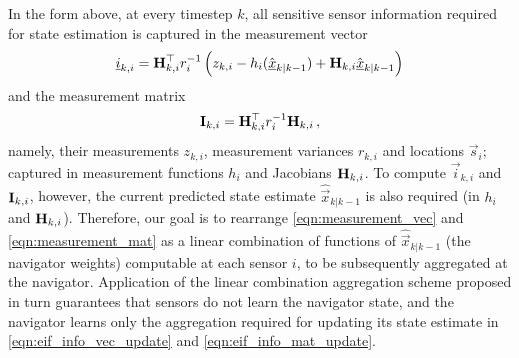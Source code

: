 In the form above, at every timestep $k$, all sensitive sensor information required for state estimation is captured in the measurement vector
\begin{equation}
    {\underline{i}}_{k,i} = {{\mathbf{H}}}^\top_{k,i} r^{-1}_i \left(z_{k,i} - h_i(\hat{{\underline{x}}}_{k|k-1}) + {{\mathbf{H}}}_{k,i}\hat{{\underline{x}}}_{k|k-1}\right) \label{eqn:measurement_vec}
\end{equation}
and the measurement matrix
\begin{equation}
    {\ensuremath{{\mathbf{I}}}}_{k,i} = {{\mathbf{H}}}^\top_{k,i} r^{-1}_i {{\mathbf{H}}}_{k,i}\,, \label{eqn:measurement_mat}
\end{equation}
namely, their measurements $z_{k,i}$, measurement variances $r_{k,i}$ and locations $\vec{s}_i$; captured in measurement functions $h_i$ and Jacobians ${{\mathbf{H}}}_{k,i}$. To compute $\vec{i}_{k,i}$ and ${{\mathbf{I}}}_{k,i}$, however, the current predicted state estimate $\hat{\vec{x}}_{k|k-1}$ is also required (in $h_i$ and ${{\mathbf{H}}}_{k,i}$). Therefore, our goal is to rearrange \eqref{eqn:measurement_vec} and \eqref{eqn:measurement_mat} as a linear combination of functions of $\hat{\vec{x}}_{k|k-1}$ (the navigator weights) computable at each sensor $i$, to be subsequently aggregated at the navigator. Application of the linear combination aggregation scheme proposed in turn guarantees that sensors do not learn the navigator state, and the navigator learns only the aggregation required for updating its state estimate in \eqref{eqn:eif_info_vec_update} and \eqref{eqn:eif_info_mat_update}.

% 
% 


